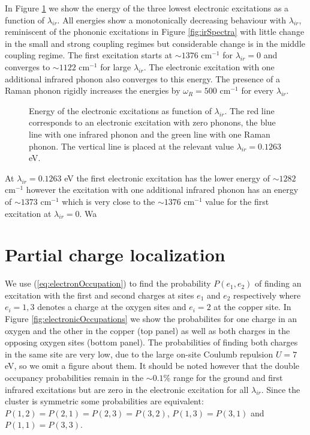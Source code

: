 In Figure \ref{fig:electrSpectra} we show the energy of the three lowest electronic excitations as a function of $\lambda_{ir}$.
All energies show a monotonically decreasing behaviour with $\lambda_{ir}$, reminiscent of the phononic excitations in Figure \ref{fig:irSpectra} with little change in the small and strong coupling regimes but considerable change is in the middle coupling regime.
The first excitation starts at $\sim 1376$ cm$^{-1}$ for $\lambda_{ir}=0$ and converges to $\sim 1122$ cm$^{-1}$ for large $\lambda_{ir}$.
The electronic excitation with one additional infrared phonon also converges to this energy.
The presence of a Raman phonon rigidly increases the energies by $\omega_R=500$ cm$^{-1}$ for every $\lambda_{ir}$.
%
\begin{figure}[ht]
  \centering
  
  \caption[Energy of the electronic excitations as function of $\lambda_{ir}$.]
  {Energy of the electronic excitations as function of $\lambda_{ir}$. 
    The red line corresponds to an electronic excitation with zero phonons, the blue line with one infrared phonon and the green line with one Raman phonon.
    The vertical line is placed at the relevant value $\lambda_{ir}=0.1263$ eV.}
  \label{fig:electrSpectra}
\end{figure}

At $\lambda_{ir}=0.1263$ eV the first electronic excitation has the lower energy of $\sim 1282$ cm$^{-1}$ however the excitation with one additional infrared phonon has an energy of $\sim 1373$ cm$^{-1}$ which is very close to the $\sim 1376$ cm$^{-1}$ value for the first excitation at $\lambda_{ir}=0$.
Wa
\section{Partial charge localization}
\label{sec:partialChargeLocalization}

We use (\ref{eq:electronOccupation}) to find the probability $P(e_1,e_2)$ of finding an excitation with the first and second charges at sites $e_1$ and $e_2$ respectively where $e_i=1,3$ denotes a charge at the oxygen sites and $e_i=2$ at the copper site.
In Figure \ref{fig:electronicOccupations} we show the probabilites for one charge in an oxygen and the other in the copper (top panel) as well as both charges in the opposing oxygen sites (bottom panel).
The probabilities of finding both charges in the same site are very low, due to the large on-site Coulumb repulsion $U=7$ eV, so we omit a figure about them.
It should be noted however that the double occupancy probabilities remain in the $\sim 0.1$\% range for the ground and first infrared excitations but are zero in the electronic excitation for all $\lambda_{ir}$.
Since the cluster is symmetric some probabilities are equivalent: $P(1,2)=P(2,1)=P(2,3)=P(3,2)$, $P(1,3)=P(3,1)$ and $P(1,1)=P(3,3)$.

